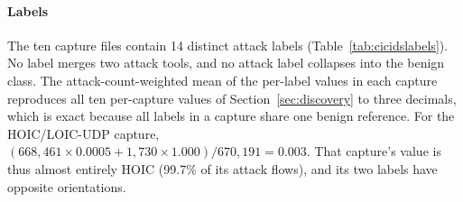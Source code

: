 \documentclass[preprint,12pt]{elsarticle}
\begin{document}
\paragraph{Labels} The ten capture files contain 14 distinct attack labels (Table~\ref{tab:cicidslabels}). No label merges two attack tools, and no attack label collapses into the benign class. The attack-count-weighted mean of the per-label values in each capture reproduces all ten per-capture values of Section~\ref{sec:discovery} to three decimals, which is exact because all labels in a capture share one benign reference. For the HOIC/LOIC-UDP capture, $(668{,}461\times 0.0005 + 1{,}730\times 1.000)/670{,}191 = 0.003$. That capture's value is thus almost entirely HOIC (99.7\% of its attack flows), and its two labels have opposite orientations.

\end{document}

